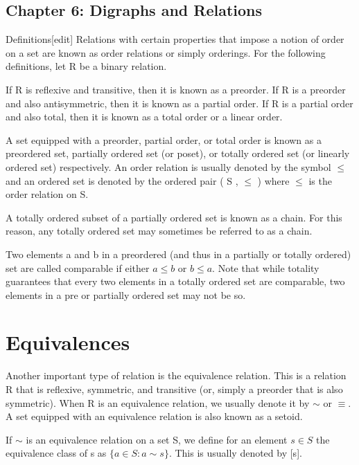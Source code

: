 \documentclass[]{report}
\begin{document}
\subsection*{Chapter 6: Digraphs and Relations}

Definitions[edit]
Relations with certain properties that impose a notion of order on a set are known as order relations or simply orderings. For the following definitions, let R be a binary relation.

If R is reflexive and transitive, then it is known as a preorder.
If R is a preorder and also antisymmetric, then it is known as a partial order.
If R is a partial order and also total, then it is known as a total order or a linear order.

A set equipped with a preorder, partial order, or total order is known as a preordered set, partially ordered set (or poset), or totally ordered set (or linearly ordered set) respectively. An order relation is usually denoted by the symbol $\le$ and an ordered set is denoted by the ordered pair ( S , $\le$ ) where $\le$ is the order relation on S.

A totally ordered subset of a partially ordered set is known as a chain. For this reason, any totally ordered set may sometimes be referred to as a chain.

Two elements a and b in a preordered (and thus in a partially or totally ordered) set are called comparable if either $a \le b$ or $b \le a$. Note that while totality guarantees that every two elements in a totally ordered set are comparable, two elements in a pre or partially ordered set may not be so.

\section{Equivalences}
Another important type of relation is the equivalence relation. This is a relation R that is reflexive, symmetric, and transitive (or, simply a preorder that is also symmetric). When R is an equivalence relation, we usually denote it by $\sim$ or $\equiv$. A set equipped with an equivalence relation is also known as a setoid.

If $\sim$ is an equivalence relation on a set S, we define for an element $s \in S$ the equivalence class of s as $\{a \in S : a \sim s\}$. This is usually denoted by [s]. 
\end{document}
